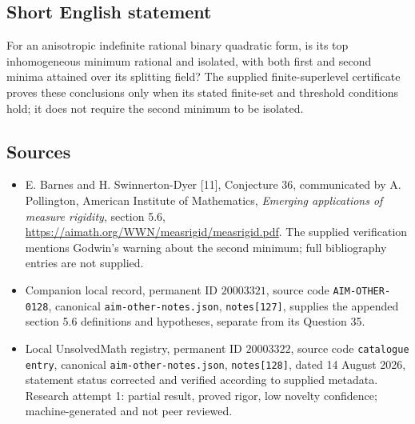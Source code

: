 \documentclass[11pt]{article}
\begin{document}
\subsection{Short English statement}
For an anisotropic indefinite rational binary quadratic form, is its top inhomogeneous minimum rational and isolated, with both first and second minima attained over its splitting field? The supplied finite-superlevel certificate proves these conclusions only when its stated finite-set and threshold conditions hold; it does not require the second minimum to be isolated.
\subsection{Sources}
\begin{itemize}
\item E. Barnes and H. Swinnerton-Dyer [11], Conjecture 36, communicated by A. Pollington, American Institute of Mathematics, \emph{Emerging applications of measure rigidity}, section 5.6, \url{https://aimath.org/WWN/measrigid/measrigid.pdf}. The supplied verification mentions Godwin's warning about the second minimum; full bibliography entries are not supplied.
\item Companion local record, permanent ID $20003321$, source code \texttt{AIM-OTHER-0128}, canonical \texttt{aim-other-notes.json}, \texttt{notes[127]}, supplies the appended section 5.6 definitions and hypotheses, separate from its Question 35.
\item Local UnsolvedMath registry, permanent ID $20003322$, source code \texttt{catalogue entry}, canonical \texttt{aim-other-notes.json}, \texttt{notes[128]}, dated 14 August 2026, statement status corrected and verified according to supplied metadata. Research attempt 1: partial result, proved rigor, low novelty confidence; machine-generated and not peer reviewed.
\end{itemize}
\end{document}
